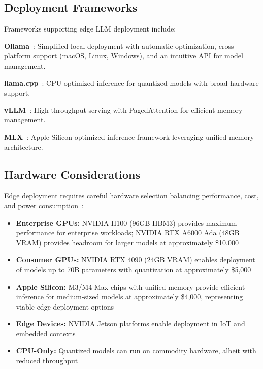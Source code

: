 \subsection{Deployment Frameworks}

Frameworks supporting edge LLM deployment include:

\textbf{Ollama}~\cite{ollama2024}: Simplified local deployment with automatic optimization, cross-platform support (macOS, Linux, Windows), and an intuitive API for model management. %

\textbf{llama.cpp}~\cite{llamacpp2024}: CPU-optimized inference for quantized models with broad hardware support.

\textbf{vLLM}~\cite{kwon2023vllm}: High-throughput serving with PagedAttention for efficient memory management.

\textbf{MLX}~\cite{apple2024mlx}: Apple Silicon-optimized inference framework leveraging unified memory architecture.

\subsection{Hardware Considerations}

Edge deployment requires careful hardware selection balancing performance, cost, and power consumption~\cite{chitty2024llm,li2024large}:

\begin{itemize}[leftmargin=*]
    \item \textbf{Enterprise GPUs:} NVIDIA H100 (96GB HBM3) provides maximum performance for enterprise workloads; NVIDIA RTX A6000 Ada (48GB VRAM) provides headroom for larger models at approximately \$10,000~\cite{nvidia2024a6000}
    \item \textbf{Consumer GPUs:} NVIDIA RTX 4090 (24GB VRAM) enables deployment of models up to 70B parameters with quantization at approximately \$5,000~\cite{nvidia2024rtx4090}
    \item \textbf{Apple Silicon:} M3/M4 Max chips with unified memory provide efficient inference for medium-sized models at approximately \$4,000, representing viable edge deployment options~\cite{feng2025profiling,hubner2025apple,dai2024gpu}
    \item \textbf{Edge Devices:} NVIDIA Jetson platforms enable deployment in IoT and embedded contexts
    \item \textbf{CPU-Only:} Quantized models can run on commodity hardware, albeit with reduced throughput
\end{itemize}

